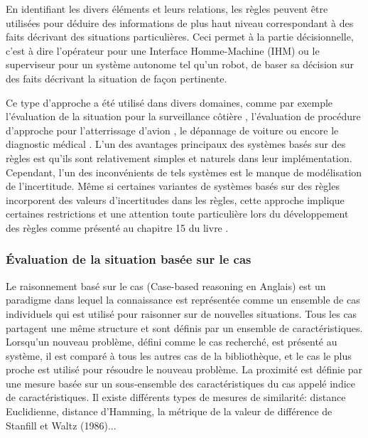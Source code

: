 \documentclass[a4paper,11pt,twoside]{StyleThese}
\begin{document}
En identifiant les divers éléments et leurs relations, les règles peuvent être utilisées pour déduire des informations de plus haut niveau correspondant à des faits décrivant des situations particulières. Ceci permet à la partie décisionnelle, c'est à dire l'opérateur pour une Interface Homme-Machine (IHM) ou le superviseur pour un système autonome tel qu'un robot, de baser sa décision sur des faits décrivant la situation de façon pertinente.

Ce type d'approche a été utilisé dans divers domaines, comme par exemple l'évaluation de la situation pour la surveillance côtière \cite{edlund2006rule}, l'évaluation de procédure d'approche pour l'atterrissage d'avion \cite{baron1980procru,milgram1984multi}, le dépannage de voiture ou encore le diagnostic médical \cite{swartout1985rule,miller1982internist}.
L'un des avantages principaux des systèmes basés sur des règles est qu'ils sont relativement simples et naturels dans leur implémentation.
Cependant, l'un des inconvénients de tels systèmes est le manque de modélisation de l'incertitude.
Même si certaines variantes de systèmes basés sur des règles incorporent des valeurs d'incertitudes dans les règles, cette approche implique certaines restrictions et une attention toute particulière lors du développement des règles comme présenté au chapitre 15 du livre \cite{russell2003artificial}.


\subsubsection{Évaluation de la situation basée sur le cas}

Le raisonnement basé sur le cas (Case-based reasoning en Anglais) est un paradigme dans lequel la connaissance est représentée comme un ensemble de cas individuels qui est utilisé pour raisonner sur de nouvelles situations. Tous les cas partagent une même structure et sont définis par un ensemble de caractéristiques. Lorsqu'un nouveau problème, défini comme le cas recherché, est présenté au système, il est comparé à tous les autres cas de la bibliothèque, et le cas le plus proche est utilisé pour résoudre le nouveau problème. La proximité est définie par une mesure basée sur un sous-ensemble des caractéristiques du cas appelé indice de caractéristiques. Il existe différents types de mesures de similarité: distance Euclidienne, distance d'Hamming, la métrique de la valeur de différence de Stanfill et Waltz (1986)...
\end{document}
